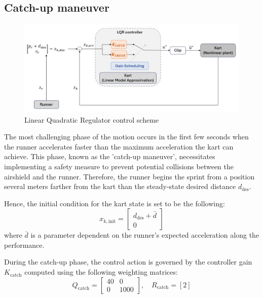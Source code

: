 \documentclass[a4paper,12pt,oneside]{book}
\begin{document}
\subsection{Catch-up maneuver}
\begin{figure}
	\centering
	\includegraphics[width=1.0\textwidth]{LQR_sim_scheme.png}
	\caption{Linear Quadratic Regulator control scheme}
	\label{image:LQR_sim_scheme}
\end{figure}

The most challenging phase of the motion occurs in the first few seconds when the runner accelerates faster than the maximum acceleration the kart can achieve.
This phase, known as the 'catch-up maneuver', necessitates implementing a safety measure to prevent potential collisions between the airshield and the runner. 
Therefore, the runner begins the sprint from a position several meters farther from the kart than the steady-state desired distance $d_{\text{des}}$.

Hence, the initial condition for the kart state is set to be the following:
\begin{equation}
    x_{k,\text{init}} =
    \begin{bmatrix}
        d_{\text{des}} + \bar{d} \\
        0
    \end{bmatrix}
\end{equation}
where $\bar{d}$ is a parameter dependent on the runner's expected acceleration along the performance.
 

During the catch-up phase, the control action is governed by the controller gain $K_{\text{catch}}$ computed using the following weighting matrices:
\begin{equation}
    Q_{\text{catch}} =
    \begin{bmatrix}
        40 & 0 \\
        0 & 1000
    \end{bmatrix},
    \quad
    R_{\text{catch}} = [2]
\end{equation}
\end{document}
